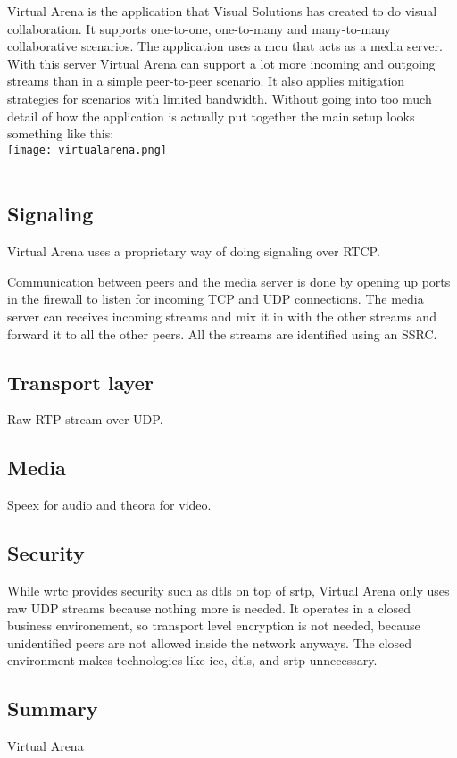 Virtual Arena is the application that Visual Solutions has created to do visual collaboration\cite{VirtualArena}. It supports one-to-one, one-to-many and many-to-many collaborative scenarios. The application uses a \gls{mcu} that acts as a media server. With this server Virtual Arena can support a lot more incoming and outgoing streams than in a simple peer-to-peer scenario. It also applies mitigation strategies for scenarios with limited bandwidth. Without going into too much detail of how the application is actually put together the main setup looks something like this: 
\\
\texttt{[image: virtualarena.png]}
\\
\\

\subsection{Signaling}
Virtual Arena uses a proprietary way of doing signaling over RTCP.

Communication between peers and the media server is done by opening up ports in the firewall to listen for incoming TCP and UDP connections. The media server can receives incoming streams and mix it in with the other streams and forward it to all the other peers. All the streams are identified using an SSRC.


\subsection{Transport layer}
Raw RTP stream over UDP.

\subsection{Media}
Speex for audio and theora for video.

\subsection{Security}
While \gls{wrtc} provides security such as \gls{dtls} on top of \gls{srtp}, Virtual Arena only uses raw UDP streams because nothing more is needed. It operates in a closed business environement, so transport level encryption is not needed, because unidentified peers are not allowed inside the network anyways.  The closed environment makes technologies like \gls{ice}, \gls{dtls}, and {srtp} unnecessary.

\subsection*{Summary}


Virtual Arena